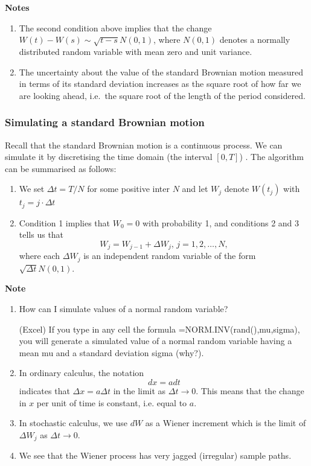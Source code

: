 \documentclass[landscape, 20pt]{extreport}
\theoremstyle{definition}
\theoremstyle{definition}
\theoremstyle{definition}
\theoremstyle{definition}
\theoremstyle{remark}
\begin{document}
\textbf{Notes}

\begin{enumerate}
\def\labelenumi{\arabic{enumi}.}
\item
  The second condition above implies that the change
  \(W(t) - W(s) \sim \sqrt{t-s} N(0,1)\), where \(N(0,1)\) denotes a
  normally distributed random variable with mean zero and unit
  variance.
\item
  The uncertainty about the value of the standard Brownian motion
  measured in terms of its standard deviation increases as the square
  root of how far we are looking ahead, i.e.~the square root of the
  length of the period considered.
\end{enumerate}

\hypertarget{simulating-a-standard-brownian-motion}{%
\subsubsection{Simulating a standard Brownian motion}\label{simulating-a-standard-brownian-motion}}

Recall that the standard Brownian motion is a continuous process. We can
simulate it by discretising the time domain (the interval \([0,T]\)) . The
algorithm can be summarised as follows:

\begin{enumerate}
\def\labelenumi{\arabic{enumi}.}
\item
  We set \(\Delta t = T/N\) for some positive inter \(N\) and let \(W_j\)
  denote \(W(t_j)\) with \(t_j = j \cdot \Delta t\)
\item
  Condition 1 implies that \(W_0 = 0\) with probability 1, and
  conditions 2 and 3 tells us that
  \[W_j = W_{j-1} + \Delta W_j, \, j = 1,2, \ldots, N,\] where each
  \(\Delta W_j\) is an independent random variable of the form
  \(\sqrt{\Delta t} N(0,1)\).
\end{enumerate}

\textbf{Note}

\begin{enumerate}
\def\labelenumi{\arabic{enumi}.}
\item
  How can I simulate values of a normal random variable?

  (Excel) If you type in any cell the formula
  =NORM.INV(rand(),mu,sigma), you will generate a simulated value of a
  normal random variable having a mean mu and a standard deviation
  sigma (why?).
\item
  In ordinary calculus, the notation \[dx = a dt\] indicates that
  \(\Delta x = a \Delta t\) in the limit as \(\Delta t \rightarrow 0\).
  This means that the change in \(x\) per unit of time is constant, i.e.
  equal to \(a\).
\item
  In stochastic calculus, we use \(dW\) as a Wiener increment which is
  the limit of \(\Delta W_j\) as \(\Delta t \rightarrow 0\).
\item
  We see that the Wiener process has very jagged (irregular) sample
  paths.
\end{enumerate}
\end{document}
